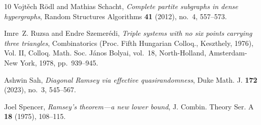 \begin{thebibliography}{10}
Vojt\v{e}ch R\"{o}dl and Mathias Schacht, \emph{Complete partite subgraphs in
  dense hypergraphs}, Random Structures Algorithms \textbf{41} (2012), no.~4,
  557--573. 

Imre~Z. Ruzsa and Endre Szemer\'{e}di, \emph{Triple systems with no six points
  carrying three triangles}, Combinatorics ({P}roc. {F}ifth {H}ungarian
  {C}olloq., {K}eszthely, 1976), {V}ol. {II}, Colloq. Math. Soc. J\'{a}nos
  Bolyai, vol.~18, North-Holland, Amsterdam-New York, 1978, pp.~939--945.

Ashwin Sah, \emph{Diagonal {R}amsey via effective quasirandomness}, Duke Math.
  J. \textbf{172} (2023), no.~3, 545--567. 

Joel Spencer, \emph{Ramsey's theorem---a new lower bound}, J. Combin. Theory
  Ser. A \textbf{18} (1975), 108--115. 

\end{thebibliography}